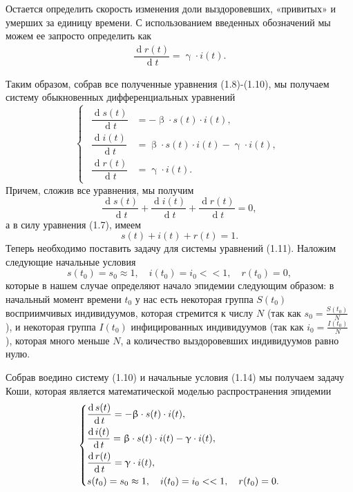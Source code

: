\documentclass[a4paper, 14pt]{extreport}
\numberwithin{equation}{section}
\renewcommand{\beta}{\upbeta}
\renewcommand{\gamma}{\upgamma}
\renewcommand{\d}{\operatorname{d}}
\begin{document}
	Остается определить скорость изменения доли выздоровевших, «привитых» и умерших за единицу времени. С использованием введенных обозначений мы можем ее запросто определить как  
	\begin{eqnarray}
		\dfrac{\d r(t)}{\d t} = \gamma\cdot i(t).
	\end{eqnarray}
	
	Таким образом, собрав все полученные уравнения (1.8)-(1.10), мы получаем систему обыкновенных дифференциальных уравнений
	\begin{equation}
		\left\{ 
		\begin{gathered} 
			\begin{aligned}
				\dfrac {\d s(t)}{\d t} &= -\beta \cdot s(t) \cdot i(t),\\
				\dfrac{\d i(t)}{\d t} &= \beta \cdot s(t)\cdot i(t) - \gamma\cdot i(t),\\
				\dfrac{\d r(t)}{\d t} &= \gamma\cdot i(t). 
			\end{aligned}
		\end{gathered} 
		\right.		
	\end{equation}
	Причем, сложив все уравнения, мы получим 
	\begin{equation}
		\dfrac {\d s(t)}{\d t} + \dfrac {\d i(t)}{\d t} + \dfrac {\d r(t)}{\d t} = 0,
	\end{equation}
	а в силу уравнения (1.7), имеем 
	\begin{equation}
		s(t) + i(t) + r(t) = 1.
	\end{equation}
	Теперь необходимо поставить задачу для системы уравнений (1.11). Наложим следующие начальные условия 
	\begin{equation}
		s(t_0) = s_0 \approx 1,\quad i(t_0) = i_0 << 1,\quad r(t_0) = 0,
	\end{equation}
	которые в нашем случае определяют начало эпидемии следующим образом: в начальный момент времени $t_0$ у нас есть некоторая группа $S(t_0)$ восприимчивых индивидуумов, которая стремится к числу $N$ (так как $s_0 = \frac{S(t_0)}N$), и некоторая группа $I(t_0)$ инфицированных индивидуумов (так как $i_0 = \frac{I(t_0)}N$), которая много меньше $N$, а количество выздоровевших индивидуумов равно нулю.
	
	Собрав воедино систему (1.10) и начальные условия (1.14) мы получаем задачу Коши, которая является математической моделью распространения эпидемии 
	$$
	\begin{dcases}
		\dfrac {\d s(t)}{\d t} = -\beta \cdot s(t) \cdot i(t),\\
		\dfrac{\d i(t)}{\d t} = \beta \cdot s(t)\cdot i(t) - \gamma\cdot i(t),\\
		\dfrac{\d r(t)}{\d t} = \gamma\cdot i(t),\\
		s(t_0) = s_0 \approx 1,\quad i(t_0) = i_0 << 1,\quad r(t_0) = 0.
	\end{dcases}
	$$
\end{document}
